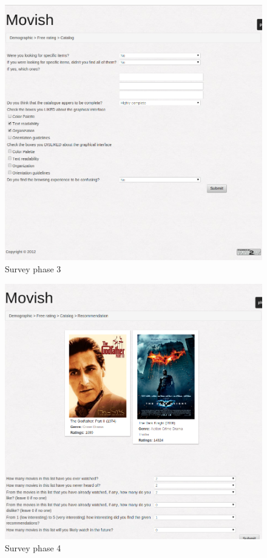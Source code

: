 \begin{figure}
  \centering
  \includegraphics[width=\textwidth]{figures/survey_catalog.png}
  \caption{Survey phase 3}
  \label{fig:survey_phase_4}
\end{figure}

\begin{figure}
  \centering
  \includegraphics[width=\textwidth]{figures/survey_recommendation.png}
  \caption{Survey phase 4}
  \label{fig:survey_phase_4}
\end{figure}

